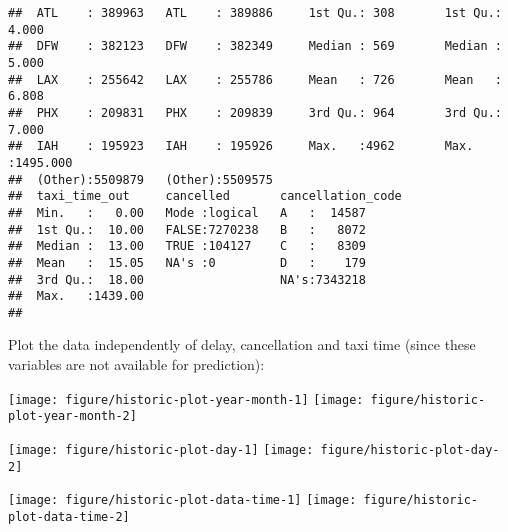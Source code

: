 \documentclass{article}\usepackage[]{graphicx}\usepackage[]{color}
\makeatletter
\newenvironment{kframe}{%
 \def\at@end@of@kframe{}%
 \ifinner\ifhmode%
  \def\at@end@of@kframe{\end{minipage}}%
  \begin{minipage}{\columnwidth}%
 \fi\fi%
 \def\FrameCommand##1{\hskip\@totalleftmargin \hskip-\fboxsep
 \colorbox{shadecolor}{##1}\hskip-\fboxsep
     \hskip-\linewidth \hskip-\@totalleftmargin \hskip\columnwidth}%
 \MakeFramed {\advance\hsize-\width
   \@totalleftmargin\z@ \linewidth\hsize
   \@setminipage}}%
 {\par\unskip\endMakeFramed%
 \at@end@of@kframe}
\newenvironment{knitrout}{}{} %
\makeatother
\begin{document}
\begin{knitrout}
\begin{kframe}
\begin{verbatim}
##  ATL    : 389963   ATL    : 389886     1st Qu.: 308       1st Qu.:   4.000  
##  DFW    : 382123   DFW    : 382349     Median : 569       Median :   5.000  
##  LAX    : 255642   LAX    : 255786     Mean   : 726       Mean   :   6.808  
##  PHX    : 209831   PHX    : 209839     3rd Qu.: 964       3rd Qu.:   7.000  
##  IAH    : 195923   IAH    : 195926     Max.   :4962       Max.   :1495.000  
##  (Other):5509879   (Other):5509575                                          
##  taxi_time_out     cancelled       cancellation_code
##  Min.   :   0.00   Mode :logical   A   :  14587     
##  1st Qu.:  10.00   FALSE:7270238   B   :   8072     
##  Median :  13.00   TRUE :104127    C   :   8309     
##  Mean   :  15.05   NA's :0         D   :    179     
##  3rd Qu.:  18.00                   NA's:7343218     
##  Max.   :1439.00                                    
## 
\end{verbatim}
\end{kframe}
\end{knitrout}




Plot the data independently of delay, cancellation and taxi time (since these variables are not available for prediction):
  


\begin{knitrout}
\color{fgcolor}

{\centering \texttt{[image: figure/historic-plot-year-month-1]} 
\texttt{[image: figure/historic-plot-year-month-2]} 

}



\end{knitrout}

\begin{knitrout}
\color{fgcolor}

{\centering \texttt{[image: figure/historic-plot-day-1]} 
\texttt{[image: figure/historic-plot-day-2]} 

}



\end{knitrout}

\begin{knitrout}
\color{fgcolor}

{\centering \texttt{[image: figure/historic-plot-data-time-1]} 
\texttt{[image: figure/historic-plot-data-time-2]} 

}



\end{knitrout}
  
\end{document}

